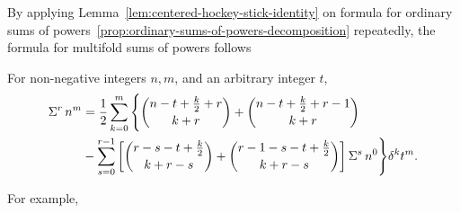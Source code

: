 By applying Lemma~\eqref{lem:centered-hockey-stick-identity} on
formula for ordinary sums of powers~\eqref{prop:ordinary-sums-of-powers-decomposition}
repeatedly, the formula for multifold sums of powers follows
\begin{theorem}
  \label{thm:multifold-sums-of-powers}
  For non-negative integers $n,m$, and an arbitrary integer $t$,
  \begin{align*}
    \Sigma^{r}\,{n}^{m}
    &= \frac{1}{2} \sum_{k=0}^{m}
    \Bigg \{
      \binom{n-t+\frac{k}{2}+r}{k+r} + \binom{n-t+\frac{k}{2}+r-1}{k+r} \\
      &-
      \sum_{s=0}^{r-1}
      \left[
        \binom{r-s-t+\frac{k}{2}}{k+r-s} + \binom{r-1-s-t+\frac{k}{2}}{k+r-s}
      \right] \Sigma^{s}\,{n}^{0}
    \Bigg \} \delta^{k} t^m.
  \end{align*}
\end{theorem}
For example,

